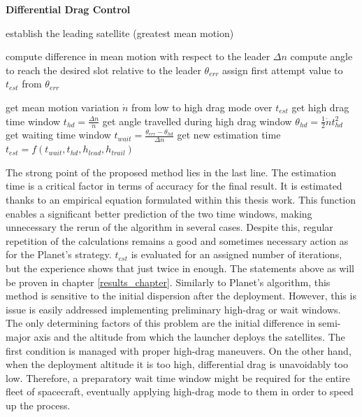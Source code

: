 \begin{algorithm}[H]
      \caption{\textbf{Differential Drag Control}}
      \begin{algorithmic}[1]

                  \State establish the leading satellite (greatest mean motion)


                  \State compute difference in mean motion with respect to the leader $\Delta n$
                  \State compute angle to reach the desired slot relative to the leader $\theta_{err}$ 
                  \State assign first attempt value to $t_{est}$ from $\theta_{err}$  
                                        
                              
                              \State get mean motion variation $\dot{n}$ from low to high drag mode over $t_{est}$
                              \State get high drag time window $t_{hd} = \frac{\Delta n}{\dot{n}}$
                              \State get angle travelled during high drag window $\theta_{hd} = \frac{1}{2}\dot{n}t_{hd}^2$
                              \State get waiting time window $t_{wait} = \frac{\theta_{err} - \theta_{hd}}{\Delta n}$
                              \State get new estimation time $t_{est} = f(t_{wait}, t_{hd}, h_{lead}, h_{trail})$ 
                        \EndFor
                  \EndFor
            \EndProcedure
      \end{algorithmic}
\end{algorithm}

The strong point of the proposed method lies in the last line.
The estimation time is a critical factor in terms of accuracy for the final result.
It is estimated thanks to an empirical equation formulated within this thesis work.
This function enables a significant better prediction of the two time windows, making unnecessary the rerun of the algorithm in several cases.
Despite this, regular repetition of the calculations remains a good and sometimes necessary action as for the Planet's strategy.
$t_{est}$ is evaluated for an assigned number of iterations, but the experience shows that just twice in enough.
The statements above as will be proven in chapter \ref{results_chapter}.
Similarly to Planet's algorithm, this method is sensitive to the initial dispersion after the deployment.
However, this is issue is easily addressed implementing preliminary high-drag or wait windows.
The only determining factors of this problem are the initial difference in semi-major axis and the altitude from which the launcher deploys the satellites.
The first condition is managed with proper high-drag maneuvers.
On the other hand, when the deployment altitude it is too high, differential drag is unavoidably too low.
Therefore, a preparatory wait time window might be required for the entire fleet of spacecraft, eventually applying high-drag mode to them in order to speed up the process.


